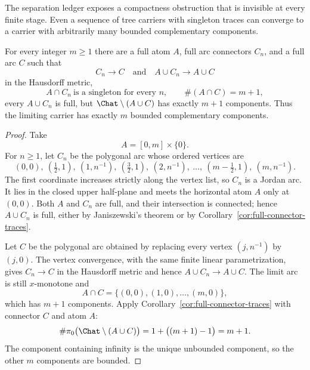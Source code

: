 The separation ledger exposes a compactness obstruction that is invisible at
every finite stage.  Even a sequence of tree carriers with singleton traces
can converge to a carrier with arbitrarily many bounded complementary
components.

\begin{proposition}
\label{prop:trace-birth}
For every integer $m\ge1$ there are a full atom $A$, full arc connectors
$C_n$, and a full arc $C$ such that
\[
 C_n\longrightarrow C
 \quad\text{and}\quad
 A\cup C_n\longrightarrow A\cup C
\]
in the Hausdorff metric,
\[
 A\cap C_n\ \text{is a singleton for every }n,
\qquad
 \#(A\cap C)=m+1,
\]
every $A\cup C_n$ is full, but $\Chat\setminus(A\cup C)$ has exactly
$m+1$ components.  Thus the limiting carrier has exactly $m$ bounded
complementary components.
\end{proposition}

\begin{proof}
Take
\[
 A=[0,m]\times\{0\}.
\]
For $n\ge1$, let $C_n$ be the polygonal arc whose ordered vertices are
\[
 (0,0),\
 \left(\tfrac12,1\right),\ (1,n^{-1}),\
 \left(\tfrac32,1\right),\ (2,n^{-1}),\ \dots,\
 \left(m-\tfrac12,1\right),\ (m,n^{-1}).
\]
The first coordinate increases strictly along the vertex list, so $C_n$ is
a Jordan arc.  It lies in the closed upper half-plane and meets the
horizontal atom $A$ only at $(0,0)$.  Both $A$ and $C_n$ are full, and their
intersection is connected; hence $A\cup C_n$ is full, either by
Janiszewski's theorem or by
Corollary~\ref{cor:full-connector-traces}.

Let $C$ be the polygonal arc obtained by replacing every vertex
$(j,n^{-1})$ by $(j,0)$.  The vertex convergence, with the same finite
linear parametrization, gives $C_n\to C$ in the Hausdorff metric and hence
$A\cup C_n\to A\cup C$.  The limit arc is still $x$-monotone and
\[
 A\cap C=\{(0,0),(1,0),\dots,(m,0)\},
\]
which has $m+1$ components.  Apply
Corollary~\ref{cor:full-connector-traces} with connector $C$ and atom $A$:
\[
 \#\pi_0\bigl(\Chat\setminus(A\cup C)\bigr)
 =1+\bigl((m+1)-1\bigr)=m+1.
\]
The component containing infinity is the unique unbounded component, so
the other $m$ components are bounded.
\end{proof}

